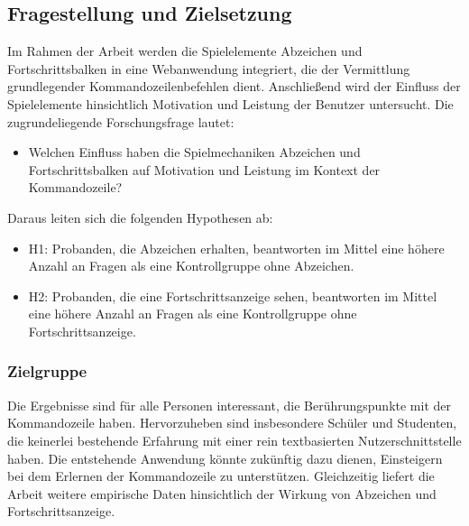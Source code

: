 
\subsection{Fragestellung und Zielsetzung}

Im Rahmen der Arbeit werden die Spielelemente Abzeichen und Fortschrittsbalken in eine Webanwendung integriert, die der Vermittlung grundlegender Kommandozeilenbefehlen dient.
Anschließend wird der Einfluss der Spielelemente hinsichtlich Motivation und Leistung der Benutzer untersucht.
Die zugrundeliegende Forschungsfrage lautet:

\begin{itemize}
    \item Welchen Einfluss haben die Spielmechaniken Abzeichen und Fortschrittsbalken auf Motivation und Leistung im Kontext der Kommandozeile?
\end{itemize}

Daraus leiten sich die folgenden Hypothesen ab:

\begin{itemize}
\item H1: Probanden, die Abzeichen erhalten, beantworten im Mittel eine höhere Anzahl an Fragen als eine Kontrollgruppe ohne Abzeichen.
\item H2: Probanden, die eine Fortschrittsanzeige sehen, beantworten im Mittel eine höhere Anzahl an Fragen als eine Kontrollgruppe ohne Fortschrittsanzeige.
\end{itemize}

\subsubsection{Zielgruppe}
Die Ergebnisse sind für alle Personen interessant, die Berührungspunkte mit der Kommandozeile haben.
Hervorzuheben sind insbesondere Schüler und Studenten, die keinerlei bestehende Erfahrung mit einer rein textbasierten Nutzerschnittstelle haben.
Die entstehende Anwendung könnte zukünftig dazu dienen, Einsteigern bei dem Erlernen der Kommandozeile zu unterstützen.
Gleichzeitig liefert die Arbeit weitere empirische Daten hinsichtlich der Wirkung von Abzeichen und Fortschrittsanzeige.

